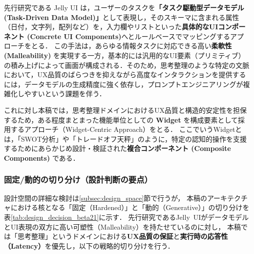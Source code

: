 \documentclass[a4paper,10pt]{jarticle}
\begin{document}
先行研究である Jelly UI\cite{cao2025jelly} は，ユーザーのタスクを\textbf{「タスク駆動型データモデル (Task-Driven Data Model)」}として表現し，そのスキーマに含まれる属性（日付，文字列，配列など）を，入力欄やリストといった\textbf{具体的なUIコンポーネント (Concrete UI Components)}へとルールベースでマッピングするアプローチをとる．
この手法は，あらゆる情報タスクに対応できる高い\textbf{柔軟性 (Malleability)} を実現する一方，基本的には汎用的なUI要素（プリミティブ）の積み上げによって画面が構成される．そのため，思考整理のような特定の文脈において，UX品質のばらつきを抑えながら高度なインタラクションを提供するには，データモデルの生成精度に強く依存し，プロンプトエンジニアリングが複雑化しやすいという課題を伴う．

これに対し本稿では，思考整理ドメインにおけるUX品質と構造的安定性を担保するため，ある程度まとまった機能単位としての \textbf{Widget} を構成要素として採用するアプローチ（Widget-Centric Approach）をとる．
ここでいうWidgetとは，「SWOT分析」や「トレードオフ天秤」のように，特定の認知的操作を支援するためにあらかじめ設計・検証された\textbf{複合コンポーネント (Composite Components)} である．


\subsubsection{固定/動的の切り分け（設計判断の要点）}
\label{subsec:design_decision_summary}

設計空間の詳細な検討は\ref{subsec:design_space}節で行うが，
本稿のアーキテクチャにおける核となる「固定（Hardened）」と「動的（Generative）」の切り分けを表\ref{tab:design_decision_beta21}に示す．
先行研究であるJelly~UI\cite{cao2025jelly}がデータモデルとUI表現の双方に高い可塑性（Malleability）を持たせているのに対し，
本稿では「思考整理」というドメインにおける\textbf{UX品質の保証}と\textbf{実行時の応答性（Latency）}を優先し，以下の戦略的切り分けを行う．
\end{document}
